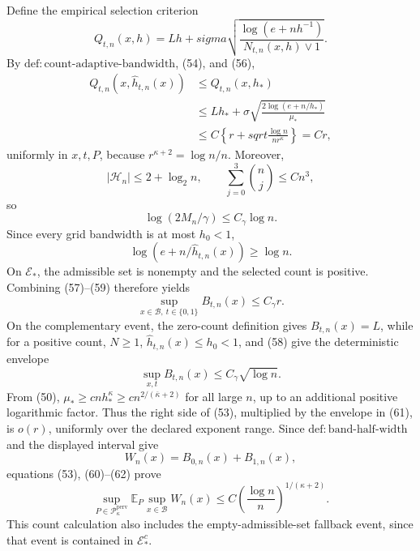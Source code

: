 Define the empirical selection criterion
\[
 Q_{t,n}(x,h)=Lh+sigma
 \sqrt{\frac{\log(e+nh^{-1})}{N_{t,n}(x,h)\vee1}}.
\]
By \(\mathrm{def:count\text{-}adaptive\text{-}bandwidth}\), (54), and (56),
\[
 \begin{aligned}
 Q_{t,n}(x,\widehat h_{t,n}(x))
 &\le Q_{t,n}(x,h_*)\\
 &\le Lh_*+\sigma\sqrt{\frac{2\log(e+n/h_*)}{\mu_*}}\\
 &\le C\left\{r+sqrt{\frac{\log n}{nr^{\kappa}}}\right\}
 =Cr,
 \end{aligned} \tag{57}
\]
uniformly in \(x,t,P\), because \(r^{\kappa+2}=\log n/n\).  Moreover,
\[
 |\mathcal H_n|\le 2+\log_2 n,
 \qquad
 \sum_{j=0}^3\binom nj\le Cn^3,
\]
so
\[
 \log(2M_n/\gamma)\le C_\gamma\log n. \tag{58}
\]
Since every grid bandwidth is at most \(h_0<1\),
\[
 \log(e+n/\widehat h_{t,n}(x))\ge\log n. \tag{59}
\]
On \(\mathcal E_*\), the admissible set is nonempty and the selected count is positive.  Combining (57)--(59) therefore yields
\[
 \sup_{x\in\mathcal B,\ t\in\{0,1\}}B_{t,n}(x)
 \le C_\gamma r. \tag{60}
\]
On the complementary event, the zero-count definition gives \(B_{t,n}(x)=L\), while for a positive count, \(N\ge1\), \(\widehat h_{t,n}(x)\le h_0<1\), and (58) give the deterministic envelope
\[
 \sup_{x,t}B_{t,n}(x)\le C_\gamma\sqrt{\log n}. \tag{61}
\]
From (50), \(\mu_*\ge cnh_*^{\kappa}\ge c n^{2/(\overline\kappa+2)}\) for all large \(n\), up to an additional positive logarithmic factor.  Thus the right side of (53), multiplied by the envelope in (61), is \(o(r)\), uniformly over the declared exponent range.  Since \(\mathrm{def:band\text{-}half\text{-}width}\) and the displayed interval give
\[
 W_n(x)=B_{0,n}(x)+B_{1,n}(x), \tag{62}
\]
equations (53), (60)--(62) prove
\[
 \sup_{P\in\mathcal P_{\kappa}^{\mathrm{perv}}}
 \mathbb E_P\sup_{x\in\mathcal B}W_n(x)
 \le C\left(\frac{\log n}{n}\right)^{1/(\kappa+2)}. \tag{63}
\]
This count calculation also includes the empty-admissible-set fallback event, since that event is contained in \(\mathcal E_*^c\).

